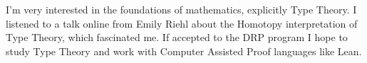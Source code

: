\documentclass[12pt]{article}
\begin{document}
	\quad I'm very interested in the foundations of mathematics, explicitly Type Theory. I listened to a talk online from Emily Riehl about the Homotopy interpretation of Type Theory, which fascinated me. If accepted to the DRP program I hope to study Type Theory and work with Computer Assisted Proof languages like Lean.
	


\end{document}
